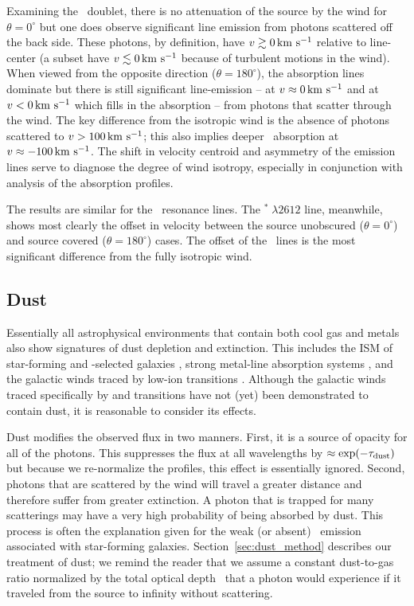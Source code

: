\documentclass[12pt,preprint]{aastex}
\begin{document}
Examining the \mgiid\ doublet, 
there is no attenuation of the source by the wind for $\theta =
0^\circ$
but one does observe significant line emission from photons scattered
off the back side.  These photons, by definition, have $v \gtrsim 0 \, {\rm km~s^{-1}}$
relative to line-center (a subset have $v \lesssim 0 \, {\rm km~s^{-1}}$ because
of turbulent motions in the wind). 
When viewed from the opposite direction ($\theta = 180^\circ$), the
absorption lines dominate but there is still significant
line-emission -- at $v \approx 0 \, {\rm km~s^{-1}}$ and at $v < 0 \, {\rm km~s^{-1}}$ which fills
in the absorption -- from photons that scatter through the wind.  The
key difference from the isotropic wind is the absence of photons
scattered to $v > 100 \, {\rm km~s^{-1}}$;  this also implies deeper 
\mgiib\ absorption at $v \approx -100 \, {\rm km~s^{-1}}$. The 
shift in velocity centroid and asymmetry of the emission lines
serve to diagnose the degree of wind isotropy, especially in
conjunction with analysis of the absorption profiles. 

The results are similar for the \feiid\ resonance lines.  The
$^* \; \lambda 2612$ line, meanwhile, shows most clearly the
offset in velocity between the source unobscured ($\theta = 0^\circ$)
and source covered ($\theta = 180^\circ$) cases.  The offset of the
\feiis\ lines is the most significant 
difference from the fully isotropic wind.

\subsection{Dust}
\label{sec:dust}

Essentially all astrophysical environments that contain both cool gas
and metals also show signatures of dust depletion and extinction.  This includes the
ISM of star-forming and -selected galaxies
\citep[e.g.][]{ss96,pw01,pcd+07}, strong  metal-line
absorption systems \citep{ykv+06,mnt+08}, and the galactic winds traced
by low-ion transitions \citep{prs+02,rvs05b}.  Although the galactic winds
traced specifically by  and  transitions have not (yet) been
demonstrated to contain dust, it is reasonable to consider its
effects.

Dust modifies the observed flux in two manners. 
First, it is a source of opacity for all of 
the photons.  This suppresses the flux at all
wavelengths by $\approx \exp(-\tau_{\rm dust})$ but because we re-normalize the
profiles, this effect is essentially ignored.  Second, photons that are
scattered by the wind will travel a greater
distance and therefore suffer from greater extinction.  A photon that is
trapped for many scatterings may have a very high probability of being absorbed
by dust.  This process is
often the explanation given for the weak (or absent) \lya\ emission
associated with star-forming galaxies. 
Section~\ref{sec:dust_method} describes our treatment of dust; we 
remind the reader that we assume a constant dust-to-gas ratio 
normalized by the total optical
depth \taud\ that a photon would experience if it traveled from the
source to infinity without scattering. 
\end{document}
